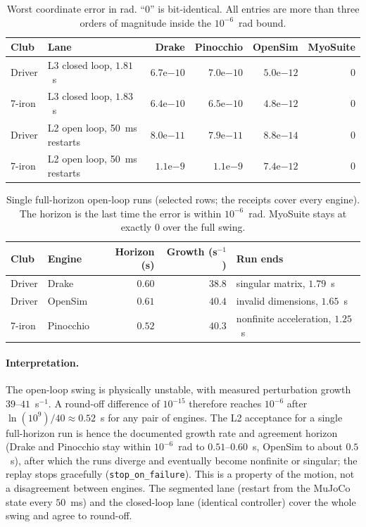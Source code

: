 \documentclass[11pt,a4paper]{article}
\begin{document}
\begin{table}[h]
\centering\small
\begin{tabular}{llrrrr}
\toprule
Club & Lane & Drake & Pinocchio & OpenSim & MyoSuite\\
\midrule
Driver & L3 closed loop, $1.81$~s & $6.7\mathrm{e}{-10}$ & $7.0\mathrm{e}{-10}$ & $5.0\mathrm{e}{-12}$ & $0$\\
7-iron & L3 closed loop, $1.83$~s & $6.4\mathrm{e}{-10}$ & $6.5\mathrm{e}{-10}$ & $4.8\mathrm{e}{-12}$ & $0$\\
Driver & L2 open loop, 50~ms restarts & $8.0\mathrm{e}{-11}$ & $7.9\mathrm{e}{-11}$ & $8.8\mathrm{e}{-14}$ & $0$\\
7-iron & L2 open loop, 50~ms restarts & $1.1\mathrm{e}{-9}$ & $1.1\mathrm{e}{-9}$ & $7.4\mathrm{e}{-12}$ & $0$\\
\bottomrule
\end{tabular}
\caption{Worst coordinate error in rad.  ``$0$'' is bit-identical.  All entries
are more than three orders of magnitude inside the $10^{-6}$~rad bound.}
\end{table}

\begin{table}[h]
\centering\small
\begin{tabular}{llrrl}
\toprule
Club & Engine & Horizon (s) & Growth (s$^{-1}$) & Run ends\\
\midrule
Driver & Drake & $0.60$ & $38.8$ & singular matrix, $1.79$~s\\
Driver & OpenSim & $0.61$ & $40.4$ & invalid dimensions, $1.65$~s\\
7-iron & Pinocchio & $0.52$ & $40.3$ & nonfinite acceleration, $1.25$~s\\
\bottomrule
\end{tabular}
\caption{Single full-horizon open-loop runs (selected rows; the receipts cover
every engine).  The horizon is the last time the error is within
$10^{-6}$~rad.  MyoSuite stays at exactly $0$ over the full swing.}
\end{table}

\paragraph{Interpretation.}  The open-loop swing is physically unstable, with
measured perturbation growth $39$--$41$~s$^{-1}$.  A round-off difference of
$10^{-15}$ therefore reaches $10^{-6}$ after $\ln(10^{9})/40\approx0.52$~s for
any pair of engines.  The L2 acceptance for a single full-horizon run is hence
the documented growth rate and agreement horizon (Drake and Pinocchio stay
within $10^{-6}$~rad to $0.51$--$0.60$~s, OpenSim to about $0.5$~s), after which
the runs diverge and eventually become nonfinite or singular; the replay stops
gracefully (\texttt{stop\_on\_failure}).  This is a property of the motion, not
a disagreement between engines.  The segmented lane (restart from the MuJoCo
state every $50$~ms) and the closed-loop lane (identical controller) cover the
whole swing and agree to round-off.
\end{document}
